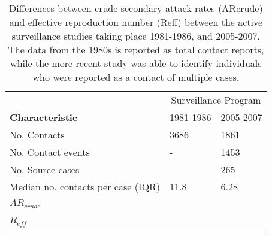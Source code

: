 \begin{table} %
\centering %
\caption{Differences between crude secondary attack rates (ARcrude) and effective reproduction number (Reff) between the active surveillance studies taking place 1981-1986, and 2005-2007. The data from the 1980s is reported as total contact reports, while the more recent study was able to identify individuals who were reported as a contact of multiple cases.} %
\begin{tabular}{p{7cm} p{3cm} p{3cm}} %
\toprule %
& \multicolumn{2}{c}{Surveillance Program} \\ %
\cmidrule(l){2-3} %
\textbf{Characteristic} & 1981-1986 & 2005-2007 \\ %
\midrule %
No. Contacts & 3686 & 1861 \\ %
No. Contact events & - & 1453 \\ %
No. Source cases & ~ & 265 \\ %
Median no. contacts per case (IQR) & 11.8 & 6.28 \\ %
$AR_{crude}$ & ~ & ~ \\ %
$R_{eff}$ & ~ & ~ \\
\bottomrule %
\end{tabular}
\label{tab:Table 1} %
\end{table}